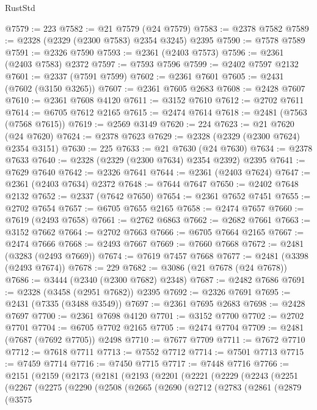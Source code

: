 \begin{lexlean}{RustStd}
\begin{coremodule}
{\begin{coremodule}
{{{{{{{{{{{{{{{{{{{{{{{{{{{{{{{{{{{{{@7579 := 223
@7582 := @21 @7579 (@24 @7579)
@7583 := @2378 @7582
@7589 := @2328 (@2329 (@2300 @7583) @2354 @3245) @2395
@7590 := @7578 @7589
@7591 := @2326 @7590
@7593 := @2361 (@2403 @7573)
@7596 := @2361 (@2403 @7583) @2372
@7597 := @7593 @7596
@7599 := @2402 @7597 @2132
@7601 := @2337 (@7591 @7599)
@7602 := @2361 @7601
@7605 := @2431 (@7602 (@3150 @3265))
@7607 := @2361 @7605 @2683
@7608 := @2428 @7607
@7610 := @2361 @7608 @4120
@7611 := @3152 @7610
@7612 := @2702 @7611
@7614 := @6705 @7612 @2165
@7615 := @2474 @7614
@7618 := @2481 (@7563 (@7568 @7615))
@7619 := @2569 @3149
@7620 := 224
@7623 := @21 @7620 (@24 @7620)
@7624 := @2378 @7623
@7629 := @2328 (@2329 (@2300 @7624) @2354 @3151)
@7630 := 225
@7633 := @21 @7630 (@24 @7630)
@7634 := @2378 @7633
@7640 := @2328 (@2329 (@2300 @7634) @2354 @2392) @2395
@7641 := @7629 @7640
@7642 := @2326 @7641
@7644 := @2361 (@2403 @7624)
@7647 := @2361 (@2403 @7634) @2372
@7648 := @7644 @7647
@7650 := @2402 @7648 @2132
@7652 := @2337 (@7642 @7650)
@7654 := @2361 @7652 @7451
@7655 := @2702 @7654
@7657 := @6705 @7655 @2165
@7658 := @2474 @7657
@7660 := @7619 (@2493 @7658)
@7661 := @2762 @6863
@7662 := @2682 @7661
@7663 := @3152 @7662
@7664 := @2702 @7663
@7666 := @6705 @7664 @2165
@7667 := @2474 @7666
@7668 := @2493 @7667
@7669 := @7660 @7668
@7672 := @2481 (@3283 (@2493 @7669))
@7674 := @7619 @7457 @7668
@7677 := @2481 (@3398 (@2493 @7674))
@7678 := 229
@7682 := @3086 (@21 @7678 (@24 @7678))
@7686 := @3444 (@2340 (@2300 @7682) @2348)
@7687 := @2482 @7686
@7691 := @2328 (@3458 (@2951 @7682)) @2395
@7692 := @2326 @7691
@7695 := @2431 (@7335 (@3488 @3549))
@7697 := @2361 @7695 @2683
@7698 := @2428 @7697
@7700 := @2361 @7698 @4120
@7701 := @3152 @7700
@7702 := @2702 @7701
@7704 := @6705 @7702 @2165
@7705 := @2474 @7704
@7709 := @2481 (@7687 (@7692 @7705)) @2498
@7710 := @7677 @7709
@7711 := @7672 @7710
@7712 := @7618 @7711
@7713 := @7552 @7712
@7714 := @7501 @7713
@7715 := @7459 @7714
@7716 := @7450 @7715
@7717 := @7448 @7716
@7766 := @2151
    (@2159
      (@2173
        (@2181
          (@2193
            (@2201
              (@2221
                (@2229
                  (@2243
                    (@2251
                      (@2267
                        (@2275
                          (@2290
                            (@2508
                              (@2665
                                (@2690
                                  (@2712
                                    (@2783
                                      (@2861
                                        (@2879
                                          (@3575
}}}}}}}}}}}}}}}}}}}}}}}}}}}}}}}}}}}}}
\end{coremodule}}
\end{coremodule}
\end{lexlean}
